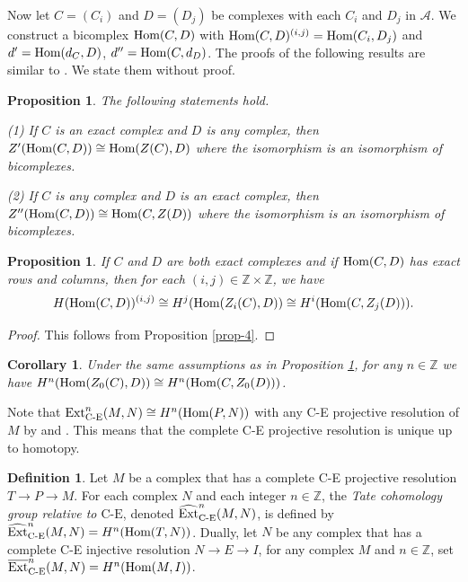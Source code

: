 \documentclass[reqno,12pt]{amsart}
\numberwithin{equation}{section}
\def\Ext{\mbox{\rm Ext}} \def\Tor{\mbox{\rm Tor}}\def\Hom{\mbox{\rm Hom}} \def\dim{\mbox{\rm dim}} \def\Iso{\mbox{\rm Iso}}
\def\dim{\mbox{\rm dim}}\def\Irr{\mbox{\rm Irr}}\def\rad{\mbox{\rm rad}}\def\fg{\mbox{\rm fg}}
\theoremstyle{plain}
\newtheorem{corollary}[theorem]{\bf Corollary}
\newtheorem{proposition}[theorem]{\bf Proposition}
\theoremstyle{definition}
\newtheorem{definition}[theorem]{\bf Definition}
\newcommand{\CE}{\mathrm{C}\text{-}\mathrm{E}}
\begin{document}
Now let $C=(C_i)$ and $D=(D_j)$ be complexes with each $C_i$ and $D_j$ in $\mathcal{A}$. We construct a bicomplex $\Hom(C,D)$ with $\Hom(C,D)^{(i,j)}=\Hom(C_i,D_j)$ and $d'=\Hom(d_C,D)$, $d''=\Hom(C,d_D)$. The proofs of the following results are similar to \cite[Proposition 3.1-3.2, Theorem 3.3 and Corollary 3.4]{EEI12}. We state them without proof.

\begin{proposition}
    The following statements hold.

    {\rm (1)} If $C$ is an exact complex and $D$ is any complex, then $Z'(\Hom(C,D))\cong \Hom(Z(C),D)$ where the isomorphism is an isomorphism of bicomplexes.

    {\rm (2)} If $C$ is any complex and $D$ is an exact complex, then $Z''(\Hom(C,D))\cong \Hom(C,Z(D))$ where the isomorphism is an isomorphism of bicomplexes.
\end{proposition}

\begin{proposition}\label{prop-11}
    If $C$ and $D$ are both exact complexes and if $\Hom(C,D)$ has exact rows and columns, then for each $(i,j)\in\mathbb{Z}\times\mathbb{Z}$, we have $$H(\Hom(C,D))^{(i,j)}\cong H^j(\Hom(Z_i(C),D))\cong H^i(\Hom(C,Z_j(D))).$$
\end{proposition}
\begin{proof}
    This follows from Proposition \ref{prop-4}.
\end{proof}

\begin{corollary}\label{coro-1}
    Under the same assumptions as in Proposition \ref{prop-11}, for any $n\in\mathbb{Z}$ we have $H^n(\Hom(Z_0(C),D))\cong H^n(\Hom(C,Z_0(D)))$.
\end{corollary}

Note that $\Ext^n_{\text{C-E}}(M,N)\cong H^n(\Hom(P,N))$ with any C-E projective resolution of $M$ by \cite[Appendix B]{G16} and \cite[Chapter XII.4]{M63}. This means that the complete C-E projective resolution is unique up to homotopy.

\begin{definition}
    Let $M$ be a complex that has a complete C-E projective resolution $T\to P\to M$. For each complex $N$ and each integer $n\in\mathbb{Z}$, the {\it Tate cohomology group relative to $\CE$}, denoted $\widehat{\Ext}^n_{\text{C-E}}(M,N)$, is defined by $\widehat{\Ext}^n_{\text{C-E}}(M,N)=H^n(\Hom(T,N))$. Dually, let $N$ be any complex that has a complete C-E injective resolution $N\to E\to I$, for any complex $M$ and $n\in\mathbb{Z}$, set $\overline{\Ext}^n_{\text{C-E}}(M,N)=H^n(\Hom(M,I))$.
\end{definition}
\end{document}
